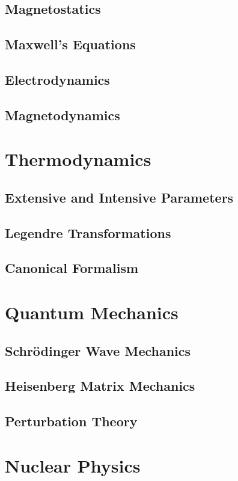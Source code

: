 \documentclass[oneside]{book}
\numberwithin{figure}{section}
\numberwithin{equation}{section}
\theoremstyle{definition}
\begin{document}
	\section{Magnetostatics}
	\section{Maxwell's Equations}
	\section{Electrodynamics}
	\section{Magnetodynamics}

	\chapter{Thermodynamics}
	\section{Extensive and Intensive Parameters}
	\section{Legendre Transformations}
	\section{Canonical Formalism}

	\chapter{Quantum Mechanics}
	\section{Schrödinger Wave Mechanics}
	\section{Heisenberg Matrix Mechanics}
	\section{Perturbation Theory}

	\chapter{Nuclear Physics}
\end{document}
